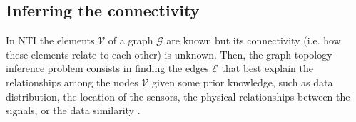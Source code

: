 %
%

\subsection{Inferring the connectivity}
In NTI the elements $\mathcal{V}$ of a graph $\mathcal{G}$ are known but its connectivity (i.e. how these elements relate to each other) is unknown. Then, the graph topology inference problem consists in finding the edges $\mathcal{E}$ that best explain the relationships among the nodes $\mathcal{V}$ given some prior knowledge, such as  data distribution, the location of the sensors, the physical relationships between the signals, or the data similarity \cite{Dong2019Learninggraphsdata,Stankovic2019Introductiongraphsignal}. 

